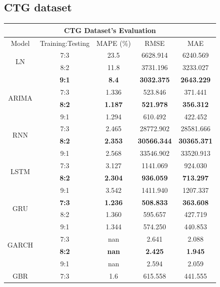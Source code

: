 \documentclass{ieeeojies}
\begin{document}
\subsection{CTG dataset} 
\begin{table}[H]
    \centering
    \begin{tabular}{|c|c|c|c|c|}
         \hline
         \multicolumn{5}{|c|}{\textbf{CTG Dataset's Evaluation}}\\
         \hline
         \centering Model & Training:Testing & MAPE (\%) & RMSE & MAE\\
         \hline
         \multirow{2}{*}{LN} & 7:3 & 23.5 & 6628.914 & 6240.569 \\ 
         & 8:2 & 11.8 & 3731.196 & 3233.027 \\ 
         & \textbf{9:1} & \textbf{8.4} & \textbf{3032.375} & \textbf{2643.229} \\
         \hline
         \multirow{2}{*}{ARIMA} & 7:3 & 1.336 & 523.846 & 371.441 \\ 
         & \textbf{8:2} & \textbf{1.187} & \textbf{521.978} & \textbf{356.312} \\ 
         & 9:1 & 1.294 & 610.492 & 422.452 \\
         \hline
         \multirow{2}{*}{RNN} & 7:3 & 2.465 & 28772.902 & 28581.666 \\ 
         & \textbf{8:2} & \textbf{2.353} & \textbf{30566.344} & \textbf{30365.371} \\ 
         & 9:1 & 2.568 & 33546.902 & 33520.913 \\
         \hline
         \multirow{2}{*}{LSTM} & 7:3 & 3.127 & 1141.069 & 924.030 \\ 
         & \textbf{8:2} & \textbf{2.304} & \textbf{936.059} & \textbf{713.297} \\ 
         & 9:1 & 3.542 & 1411.940 & 1207.337 \\
         \hline
         \multirow{2}{*}{GRU} & \textbf{7:3} & \textbf{1.236} & \textbf{508.833} & \textbf{363.608} \\ 
         & 8:2 & 1.360 & 595.657 & 427.719 \\ 
         & 9:1 & 1.344 & 574.250 & 440.853 \\
         \hline
         \multirow{2}{*}{GARCH} & 7:3 & nan & 2.641 & 2.088 \\ 
         & \textbf{8:2} & \textbf{nan} & \textbf{2.425} & \textbf{1.945} \\ 
         & 9:1 & nan & 2.594 & 2.059 \\
         \hline
         \multirow{2}{*}{GBR} & 7:3 & 1.6 & 615.558 & 441.555 \\ 

\end{tabular}
\end{table}
\end{document}
